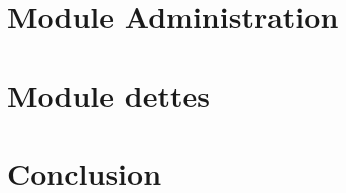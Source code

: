 \documentclass[twoside,UTF8]{EPURapport}
\begin{document}
\chapter{Module Administration}

\chapter{Module dettes}

\chapter{Conclusion}

\end{document}
